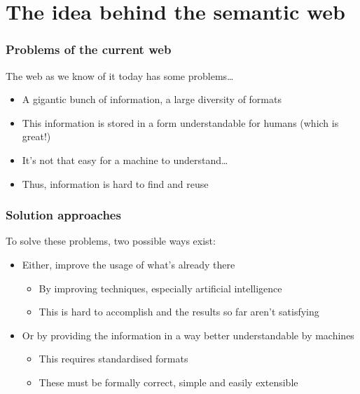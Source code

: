 \documentclass{beamer}
\begin{document}
    \section{The idea behind the semantic web}

        \begin{frame}
            \frametitle{Problems of the current web}

            The web as we know of it today has some problems\ldots
            \vskip 0.7cm
            \pause

            \begin{itemize}
                \item A gigantic bunch of information, a large diversity of formats
                \pause
                \item This information is stored in a form understandable for humans (which is great!)
                \pause
                \item It's not that easy for a machine to understand\ldots 
                \pause
                \item Thus, information is hard to find and reuse
            \end{itemize}
        \end{frame}

        \begin{frame}
            \frametitle{Solution approaches}

            To solve these problems, two possible ways exist:
            \vskip 0.7cm
            \pause

            \begin{itemize}
                \item Either, improve the usage of what's already there
                \pause
                \begin{itemize}
                    \item By improving techniques, especially artificial intelligence
                    \pause
                    \item This is hard to accomplish and the results so far aren't satisfying
                    \pause
                \end{itemize}
                \item Or by providing the information in a way better understandable by machines
                \pause
                \begin{itemize}
                    \item This requires standardised formats
                    \pause
                    \item These must be formally correct, simple and easily extensible
                \end{itemize}
            \end{itemize}
        \end{frame}
\end{document}
